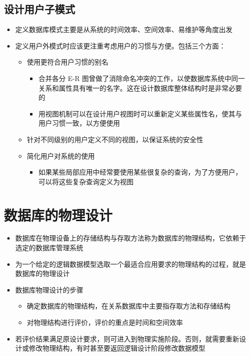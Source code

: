 \subsection{设计用户子模式}
\begin{itemize}
    \item 定义数据库模式主要是从系统的时间效率、空间效率、易维护等角度出发
    \item 定义用户外模式时应该更注重考虑用户的习惯与方便。包括三个方面：
    \begin{itemize}
        \item 使用更符合用户习惯的别名
        \begin{itemize}
            \item 合并各分 E-R 图曾做了消除命名冲突的工作，以使数据库系统中同一关系和属性具有唯一的名字。这在设计数据库整体结构时是非常必要的
            \item 用视图机制可以在设计用户视图时可以重新定义某些属性名，使其与用户习惯一致，以方便使用
        \end{itemize}
        \item 针对不同级别的用户定义不同的视图，以保证系统的安全性
        \item 简化用户对系统的使用
        \begin{itemize}
            \item 如果某些局部应用中经常要使用某些很复杂的查询，为了方便用户，可以将这些复杂查询定义为视图
        \end{itemize}
    \end{itemize}
\end{itemize}

\section{数据库的物理设计}
\begin{itemize}
    \item 数据库在物理设备上的存储结构与存取方法称为数据库的物理结构，它依赖于选定的数据库管理系统
    \item 为一个给定的逻辑数据模型选取一个最适合应用要求的物理结构的过程，就是数据库的物理设计
    \item 数据库物理设计的步骤
    \begin{itemize}
        \item 确定数据库的物理结构，在关系数据库中主要指存取方法和存储结构
        \item 对物理结构进行评价，评价的重点是时间和空间效率   
    \end{itemize}
    \item 若评价结果满足原设计要求，则可进入到物理实施阶段。否则，就需要重新设计或修改物理结构，有时甚至要返回逻辑设计阶段修改数据模型
\end{itemize}

